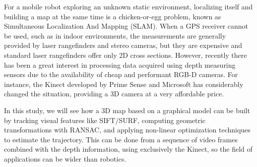 For a mobile robot exploring an unknown static environment, localizing itself and building a map at the same time is a chicken-or-egg problem, known as Simultaneous Localization And Mapping (SLAM). When a GPS receiver cannot be used, such as in indoor environments, the measurements are generally provided by laser rangefinders and stereo cameras, but they are expensive and standard laser rangefinders offer only 2D cross sections. However, recently there has been a great interest in processing data acquired using depth measuring sensors due to the availability of cheap and performant RGB-D cameras. For instance, the Kinect developed by Prime Sense and Microsoft has considerably changed the situation, providing a 3D camera at a very affordable price.

In this study, we will see how a 3D map based on a graphical model can be built by tracking visual features like SIFT/SURF, computing geometric transformations with RANSAC, and applying non-linear optimization techniques to estimate the trajectory. This can be done from a sequence of video frames combined with the depth information, using exclusively the Kinect, so the field of applications can be wider than robotics.
